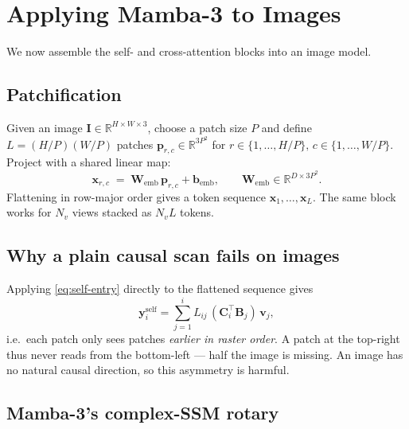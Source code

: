 \documentclass[11pt,a4paper]{article}
\begin{document}
\section{Applying Mamba-3 to Images}
\label{sec:images}

We now assemble the self- and cross-attention blocks into an image
model.

\subsection{Patchification}

Given an image $\bm{I}\in\mathbb{R}^{H\times W\times 3}$, choose a
patch size $P$ and define $L = (H/P)(W/P)$ patches
$\bm{p}_{r,c}\in\mathbb{R}^{3P^2}$ for
$r\in\{1,\dots,H/P\},\,c\in\{1,\dots,W/P\}$. Project with a shared
linear map:
\begin{equation}\label{eq:patch-embed}
  \bm{x}_{r,c} \;=\; \bm{W}_{\text{emb}}\,\bm{p}_{r,c} + \bm{b}_{\text{emb}},
  \qquad \bm{W}_{\text{emb}}\in\mathbb{R}^{D\times 3P^2}.
\end{equation}
Flattening in row-major order gives a token sequence
$\bm{x}_1,\dots,\bm{x}_L$. The same block works for $N_v$ views
stacked as $N_v L$ tokens.

\subsection{Why a plain causal scan fails on images}

Applying \eqref{eq:self-entry} directly to the flattened sequence
gives
\begin{equation}
  \bm{y}_i^{\text{self}} = \sum_{j=1}^{i} L_{ij}\,(\bm{C}_i^\top\bm{B}_j)\,\bm{v}_j,
\end{equation}
i.e.\ each patch only sees patches \emph{earlier in raster order}.
A patch at the top-right thus never reads from the bottom-left — half
the image is missing. An image has no natural causal direction, so
this asymmetry is harmful.

\subsection{Mamba-3's complex-SSM rotary}
\label{sec:rope}
\end{document}
